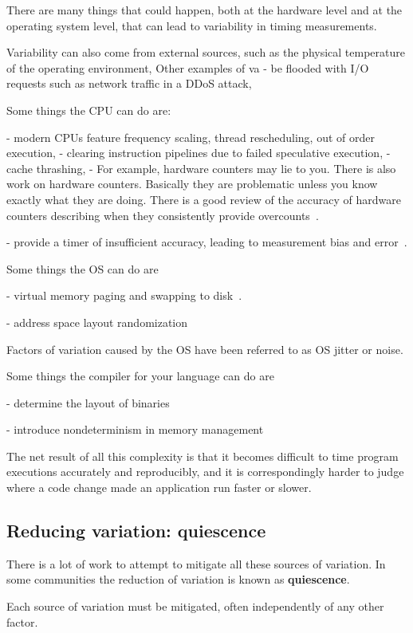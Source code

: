 \documentclass[conference]{IEEEtran}
\begin{document}
There are many things that could happen, both at the hardware level and at the
operating system level, that can lead to variability in timing measurements.

Variability can also come from external sources, such as the physical temperature
of the operating environment, Other examples of va
- be flooded with I/O requests such as network traffic in a DDoS attack,

Some things the CPU can do are:

- modern CPUs feature frequency scaling, thread rescheduling,
out of order execution,
- clearing instruction pipelines due to failed speculative execution,
- cache thrashing,
- For example, hardware counters may lie to you.
There is also work on hardware counters. Basically they are problematic unless you know exactly what they are doing. There is a good review of the accuracy of hardware counters describing when they consistently provide overcounts~\cite{Weaver2013}.

- provide a timer of insufficient accuracy, leading to measurement bias and error~\cite{Mytkowicz2009}.

Some things the OS can do are

- virtual memory paging and swapping to disk~\cite{Oyama2014,Oyama2016}.

- address space layout randomization

Factors of variation caused by the OS have been referred to as OS jitter or noise.

Some things the compiler for your language can do are

- determine the layout of binaries

- introduce nondeterminism in memory management

The net result of all this complexity is that it becomes difficult to time
program executions accurately and reproducibly, and it is correspondingly harder
to judge where a code change made an application run faster or slower.


\subsection{Reducing variation: quiescence}

There is a lot of work to attempt to mitigate all these sources of variation.
In some communities the reduction of variation is known as \textbf{quiescence}.

Each source of variation must be mitigated, often independently of any other
factor.
\end{document}

